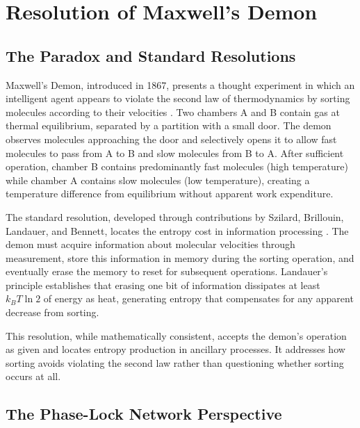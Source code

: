 \section{Resolution of Maxwell's Demon}
\label{sec:demon}

\subsection{The Paradox and Standard Resolutions}

Maxwell's Demon, introduced in 1867, presents a thought experiment in which an intelligent agent appears to violate the second law of thermodynamics by sorting molecules according to their velocities \citep{maxwell1871}. Two chambers A and B contain gas at thermal equilibrium, separated by a partition with a small door. The demon observes molecules approaching the door and selectively opens it to allow fast molecules to pass from A to B and slow molecules from B to A. After sufficient operation, chamber B contains predominantly fast molecules (high temperature) while chamber A contains slow molecules (low temperature), creating a temperature difference from equilibrium without apparent work expenditure.

The standard resolution, developed through contributions by Szilard, Brillouin, Landauer, and Bennett, locates the entropy cost in information processing \citep{szilard1929, brillouin1951, landauer1961, bennett1982}. The demon must acquire information about molecular velocities through measurement, store this information in memory during the sorting operation, and eventually erase the memory to reset for subsequent operations. Landauer's principle establishes that erasing one bit of information dissipates at least $k_B T \ln 2$ of energy as heat, generating entropy that compensates for any apparent decrease from sorting.

This resolution, while mathematically consistent, accepts the demon's operation as given and locates entropy production in ancillary processes. It addresses how sorting avoids violating the second law rather than questioning whether sorting occurs at all.

\subsection{The Phase-Lock Network Perspective}

